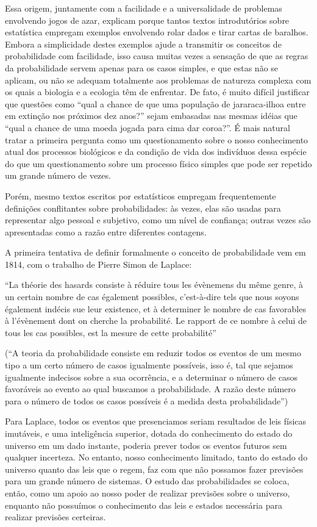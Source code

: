 \documentclass[12pt,a4paper]{article}
\begin{document}
Essa origem, juntamente com a facilidade e a universalidade de problemas envolvendo jogos de azar, explicam porque tantos textos
introdutórios sobre estatística empregam exemplos envolvendo rolar dados e tirar cartas de baralhos. Embora a simplicidade
destes exemplos ajude a transmitir os conceitos de probabilidade com facilidade, isso causa muitas vezes a sensação de que
as regras da probabilidade servem apenas para os casos simples, e que estas não se aplicam, ou não se adequam totalmente aos 
problemas de natureza complexa com os quais a biologia e a ecologia têm de enfrentar. De fato, é muito difícil justificar que
questões como ``qual a chance de que uma população de jararaca-ilhoa entre em extinção nos próximos dez anos?'' sejam embasadas
nas mesmas idéias que ``qual a chance de uma moeda jogada para cima dar coroa?''. É mais natural tratar a primeira pergunta como
um questionamento sobre o nosso conhecimento atual dos processos biológicos e da condição de vida dos indivíduos dessa espécie
do que um questionamento sobre um processo físico simples que pode ser repetido um grande número de vezes. 

Porém, mesmo textos escritos por estatísticos empregam frequentemente definições conflitantes sobre probabilidades: às vezes,
elas são usadas para representar algo pessoal e subjetivo, como um nível de confiança; outras vezes são apresentadas como a
razão entre diferentes contagens.

A primeira tentativa de definir formalmente o conceito de probabilidade vem em 1814,
com o trabalho de Pierre Simon de Laplace:

``La théorie des hasards consiste à réduire tous les évènemens du même genre, à un certain nombre de cas également
possibles, c'est-à-dire tels que nous soyons également indécis sue leur existence, et à determiner le nombre de cas
favorables à l'évènement dont on cherche la probabilité. Le rapport de ce nombre à celui de tous les cas possibles,
est la mesure de cette probabilité'' \cite{Laplace1814}

(``A teoria da probabilidade consiste em reduzir todos os eventos de um mesmo tipo a um certo número de casos igualmente
possíveis, isso é, tal que sejamos igualmente indecisos sobre a sua ocorrência, e a determinar o número de casos
favoráveis ao evento ao qual buscamos a probabilidade. A razão deste número para o número de todos os casos possíveis
é a medida desta probabilidade'')

Para Laplace, todos os eventos que presenciamos seriam resultados de leis físicas
imutáveis, e uma inteligência superior, dotada do conhecimento do estado do universo em um dado instante, poderia prever
todos os eventos futuros sem qualquer incerteza. No entanto, nosso conhecimento limitado, tanto do estado do universo
quanto das leis que o regem, faz com que não possamos fazer previsões para um grande número de sistemas. O estudo das 
probabilidades se coloca, então, como um apoio ao nosso poder de realizar previsões sobre o universo, 
enquanto não possuímos o conhecimento das leis e estados necessária para realizar previsões certeiras. 
\end{document}
